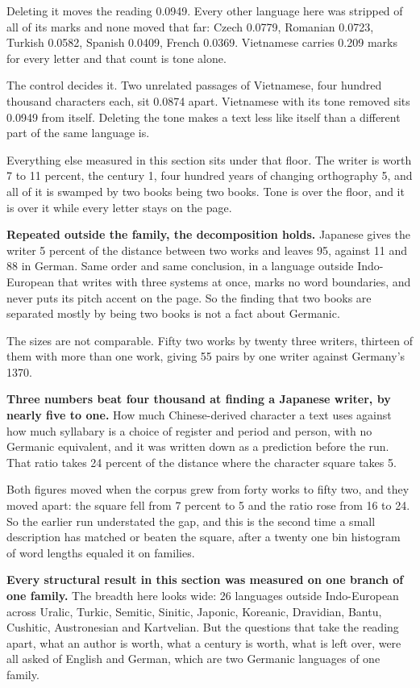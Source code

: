 Deleting it moves the reading 0.0949. Every other language here was stripped of all of its marks and none moved that far: Czech 0.0779, Romanian 0.0723, Turkish 0.0582, Spanish 0.0409, French 0.0369. Vietnamese carries 0.209 marks for every letter and that count is tone alone.

The control decides it. Two unrelated passages of Vietnamese, four hundred thousand characters each, sit 0.0874 apart. Vietnamese with its tone removed sits 0.0949 from itself. Deleting the tone makes a text less like itself than a different part of the same language is.

Everything else measured in this section sits under that floor. The writer is worth 7 to 11 percent, the century 1, four hundred years of changing orthography 5, and all of it is swamped by two books being two books. Tone is over the floor, and it is over it while every letter stays on the page.

\textbf{Repeated outside the family, the decomposition holds.} Japanese gives the writer 5 percent of the distance between two works and leaves 95, against 11 and 88 in German. Same order and same conclusion, in a language outside Indo-European that writes with three systems at once, marks no word boundaries, and never puts its pitch accent on the page. So the finding that two books are separated mostly by being two books is not a fact about Germanic.

The sizes are not comparable. Fifty two works by twenty three writers, thirteen of them with more than one work, giving 55 pairs by one writer against Germany's 1370.

\textbf{Three numbers beat four thousand at finding a Japanese writer, by nearly five to one.} How much Chinese-derived character a text uses against how much syllabary is a choice of register and period and person, with no Germanic equivalent, and it was written down as a prediction before the run. That ratio takes 24 percent of the distance where the character square takes 5.

Both figures moved when the corpus grew from forty works to fifty two, and they moved apart: the square fell from 7 percent to 5 and the ratio rose from 16 to 24. So the earlier run understated the gap, and this is the second time a small description has matched or beaten the square, after a twenty one bin histogram of word lengths equaled it on families.

\textbf{Every structural result in this section was measured on one branch of one family.} The breadth here looks wide: 26 languages outside Indo-European across Uralic, Turkic, Semitic, Sinitic, Japonic, Koreanic, Dravidian, Bantu, Cushitic, Austronesian and Kartvelian. But the questions that take the reading apart, what an author is worth, what a century is worth, what is left over, were all asked of English and German, which are two Germanic languages of one family.

